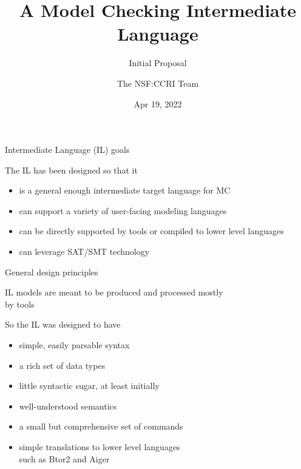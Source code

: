 \documentclass[10pt,aspectratio=149]{beamer}
\title{
{\LARGE A Model Checking Intermediate Language}
\\[1ex]
}
\subtitle{\Large Initial Proposal}
\author{\large The NSF:CCRI Team}
\date{Apr 19, 2022}
\begin{document}


\begin{frame}
\titlepage

\end{frame}


\begin{frame}{Intermediate Language (IL)  goals}
\large 

The IL has been designed so that it
\bigskip

\begin{itemize}
\item
is a \alert{general enough} intermediate \alert{target language} for MC
\medskip

\item
can support a \alert{variety} of user-facing \alert{modeling languages}
\medskip

\item
can be \alert{directly supported} by tools or \alert{compiled} to lower level languages
\medskip

\item
can leverage SAT/SMT technology
\end{itemize}


\end{frame}


\begin{frame}{General design principles}
\large

IL models are meant to be \alert{produced and processed} mostly \\
\alert{by tools}
\bigskip
\medskip
\pause

So the IL was designed to have
\medskip


\begin{itemize}
\item<2,8> \alert{simple}, easily parsable \alert{syntax}
\item<3,8> a \alert{rich set} of \alert{data types}
\item<4,8> little syntactic sugar, at least initially
\item<5,8> \alert{well-understood semantics}
\item<6,8> a \alert{small} but comprehensive \alert{set of commands}
\item<7-> \alert{simple translations to lower level} languages \\
      such as Btor2 and Aiger
\end{itemize}


\end{frame}
\end{document}
